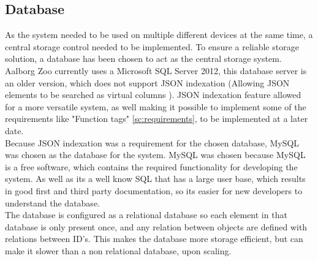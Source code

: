 \subsection{Database}\label{ssc:tech_database}
As the system needed to be used on multiple different devices at the same time, a central storage control needed to be implemented. To ensure a reliable storage solution, a database has been chosen to act as the central storage system. Aalborg Zoo currently uses a Microsoft SQL Server 2012, this database server is an older version, which does not support JSON indexation (Allowing JSON elements to be searched as virtual columns \cite{MySQLJSON}). JSON indexation feature allowed for a more versatile system, as well making it possible to implement some of the requirements like "Function tags" \autoref{sc:requirements}, to be implemented at a later date. \\
Because JSON indexation was a requirement for the chosen database, MySQL was chosen as the database for the system. MySQL was chosen because MySQL is a free software, which contains the required functionality for developing the system. As well as its a well know SQL that has a large user base, which results in good first and third party documentation, so its easier for new developers to understand the database. \\

The database is configured as a relational database \cite{RelationalDB} so each element in that database is only present once, and any relation between objects are defined with relations between ID's. This makes the database more storage efficient, but can make it slower than a non relational database, upon scaling. \\
